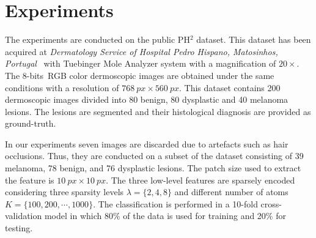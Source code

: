 \section{Experiments}
\label{sec:exp}
The experiments are conducted on the public PH$^2$ dataset.
This dataset has been acquired at \textit{Dermatology Service of Hospital Pedro Hispano, Matosinhos, Portugal}~\cite{mendoncca2013ph} with Tuebinger Mole Analyzer system with a magnification of $20 \times$.
The 8-bits~RGB color dermoscopic images are obtained under the same conditions with a resolution of $\SI{768}{px} \times \SI{560}{px}$. 
This dataset contains 200 dermoscopic images divided into 80 benign, 80 dysplastic and 40 melanoma lesions. 
The lesions are segmented and their histological diagnosis are provided as ground-truth. 

In our experiments seven images are discarded due to artefacts such as hair occlusions.
Thus, they are conducted on a subset of the dataset consisting of 39 melanoma, 78 benign, and 76 dysplastic lesions.
The patch size used to extract the feature is $\SI{10}{px} \times \SI{10}{px}$.
The three low-level features are sparsely encoded considering three sparsity levels $\lambda=\{2,4,8\}$ and different number of atoms $K = \{100, 200, \cdots, 1000\}$.
The classification is performed in a 10-fold cross-validation model in which 80\% of the data is used for training and 20\% for testing. 
 